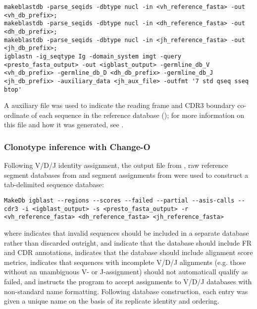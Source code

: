 \begin{lstlisting}
makeblastdb -parse_seqids -dbtype nucl -in <vh_reference_fasta> -out <vh_db_prefix>;
makeblastdb -parse_seqids -dbtype nucl -in <dh_reference_fasta> -out <dh_db_prefix>;
makeblastdb -parse_seqids -dbtype nucl -in <jh_reference_fasta> -out <jh_db_prefix>;
igblastn -ig_seqtype Ig -domain_system imgt -query <presto_fasta_output> -out <igblast_output> -germline_db_V <vh_db_prefix> -germline_db_D <dh_db_prefix> -germline_db_J <jh_db_prefix> -auxiliary_data <jh_aux_file> -outfmt '7 std qseq sseq btop'
\end{lstlisting}

A \jh auxiliary file was used to indicate the reading frame and CDR3 boundary co-ordinate of each \jh sequence in the reference database (); for more information on this file and how it was generated, see .

\subsubsection{Clonotype inference with Change-O}
\label{sec:methods_comp_igpreproc_clones}

Following V/D/J identity assignment, the output  file from , raw reference segment databases from  and segment assignments from  were used to construct a tab-delimited  sequence database:

\begin{lstlisting}
MakeDb igblast --regions --scores --failed --partial --asis-calls --cdr3 -i <igblast_output> -s <presto_fasta_output> -r <vh_reference_fasta> <dh_reference_fasta> <jh_reference_fasta>
\end{lstlisting}

\noindent where  indicates that invalid sequences should be included in a separate database rather than discarded outright,  and  indicate that the database should include FR and CDR annotations,  indicates that the database should include alignment score metrics,  indicates that sequences with incomplete V/D/J alignments (e.g. those without an unambiguous V- or J-assignment) should not automaticall qualify as failed, and  instructs the program to accept assignments to V/D/J databases with non-standard name formatting. Following database construction, each entry was given a unique name on the basis of its replicate identity and ordering. 

